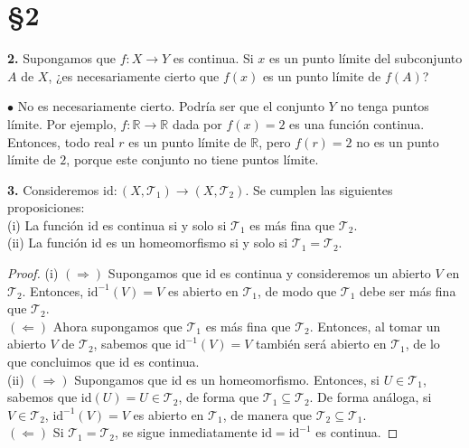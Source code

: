 \documentclass{article}
\begin{document}
\section*{§2 }

\begin{mybox}
	\textbf{2. }  Supongamos que $f: X \rightarrow Y$ es continua. Si $x$ es un punto límite del subconjunto $A$ de $X$, ¿es necesariamente cierto que $f(x)$ es un punto límite de $f(A)$? 
\end{mybox}	

$\bullet$ No es necesariamente cierto. Podría ser que el conjunto $Y$ no tenga puntos límite. Por ejemplo, $f: \mathbb{R} \rightarrow \mathbb{R}$ dada por $f(x) = 2$ es una función continua. Entonces, todo real $r$ es un punto límite de $\mathbb{R}$, pero $f(r) = 2$ no es un punto límite de ${2}$, porque este conjunto no tiene puntos límite.  

\begin{mybox}
	\textbf{3. } Consideremos $\text{id}: (X, \mathcal{T}_{1}) \rightarrow (X, \mathcal{T}_{2})$. Se cumplen las siguientes proposiciones: \\
	
	(i) La función $\text{id}$ es continua si y solo si $\mathcal{T}_{1}$ es más fina que $\mathcal{T}_{2}$. \\
	
	(ii) La función id es un homeomorfismo si y solo si $\mathcal{T}_{1} = \mathcal{T}_{2}$.  
\end{mybox}	
\begin{proof}
	(i) $(\Rightarrow)$ Supongamos que id es continua y consideremos un abierto $V$ en $\mathcal{T}_{2}$. Entonces, $\text{id}^{-1}(V) = V$ es abierto en $\mathcal{T}_{1}$, de modo que $\mathcal{T}_{1}$ debe ser más fina que $\mathcal{T}_{2}$. \\
	$(\Leftarrow)$ Ahora supongamos que $\mathcal{T}_{1}$ es más fina que $\mathcal{T}_{2}$. Entonces, al tomar un abierto $V$ de $\mathcal{T}_{2}$, sabemos que $\text{id}^{-1}(V) = V$ también será abierto en $\mathcal{T}_{1}$, de lo que concluimos que id es continua. \\
	
	(ii) $(\Rightarrow)$ Supongamos que id es un homeomorfismo. Entonces, si $U \in \mathcal{T}_{1}$, sabemos que $\text{id}(U) = U \in \mathcal{T}_{2}$, de forma que $\mathcal{T}_{1} \subseteq \mathcal{T}_{2}$.   De forma análoga, si $V \in \mathcal{T}_{2}$, $\text{id}^{-1}(V) = V$ es abierto en $\mathcal{T}_{1}$, de manera que $\mathcal{T}_{2} \subseteq \mathcal{T}_{1}$. \\
	$(\Leftarrow)$ Si $\mathcal{T}_{1} = \mathcal{T}_{2}$, se sigue inmediatamente $\text{id} = \text{id}^{-1}$ es continua.  
\end{proof}
\end{document}

